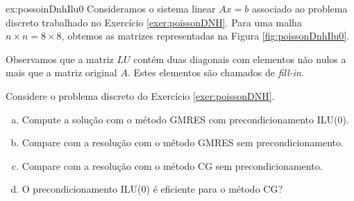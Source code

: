 \begin{ex}{ex:possoinDnhIlu0}
  Consideramos o sistema linear $Ax = b$ associado ao problema discreto trabalhado no Exercício \ref{exer:poissonDNH}. Para uma malha $n\times n=8\times 8$, obtemos as matrizes representadas na Figura \ref{fig:poissonDnhIlu0}.

  Observamos que a matriz $LU$ contém duas diagonais com elementos não nulos a mais que a matriz original $A$. Estes elementos são chamados de {\it fill-in}. 
\end{ex}




\begin{exer}
  Considere o problema discreto do Exercício \ref{exer:poissonDNH}.
  \begin{enumerate}[a)]
  \item Compute a solução com o método GMRES com precondicionamento ILU(0).
  \item Compare com a resolução com o método GMRES sem precondicionamento.
  \item Compare com a resolução com o método CG sem precondicionamento.
  \item O precondicionamento ILU(0) é eficiente para o método CG?
  \end{enumerate}
\end{exer}
